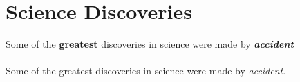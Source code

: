 \documentclass{article}
\begin{document}
	\section{Science Discoveries}
	Some of the \textbf{greatest}
	discoveries in \underline{science} were made by
	\textbf{\textit{accident}}
	
	\paragraph{}
	Some of the greatest discoveries in science were made by \emph{accident}.
	
\end{document}
